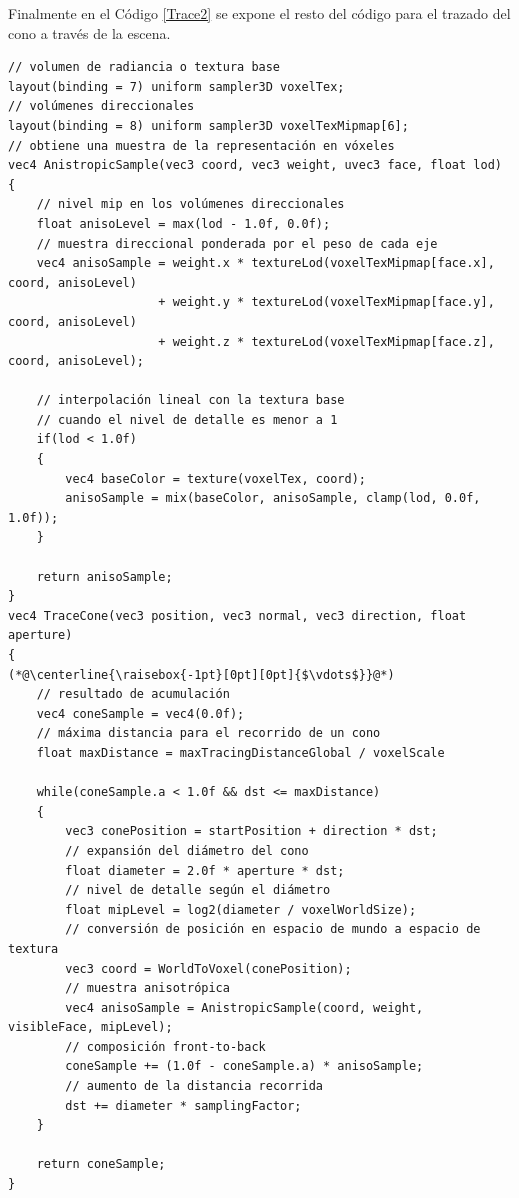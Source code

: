 Finalmente en el Código \ref{Trace2} se expone el resto del código para el trazado del cono a través de la escena.
\\
\begin{lstlisting}[caption={Trazado de cono con vóxeles.}, label=Trace2]
// volumen de radiancia o textura base
layout(binding = 7) uniform sampler3D voxelTex;
// volúmenes direccionales
layout(binding = 8) uniform sampler3D voxelTexMipmap[6];
// obtiene una muestra de la representación en vóxeles
vec4 AnistropicSample(vec3 coord, vec3 weight, uvec3 face, float lod)
{
    // nivel mip en los volúmenes direccionales
    float anisoLevel = max(lod - 1.0f, 0.0f);
    // muestra direccional ponderada por el peso de cada eje
    vec4 anisoSample = weight.x * textureLod(voxelTexMipmap[face.x], coord, anisoLevel)
                     + weight.y * textureLod(voxelTexMipmap[face.y], coord, anisoLevel)
                     + weight.z * textureLod(voxelTexMipmap[face.z], coord, anisoLevel);

    // interpolación lineal con la textura base 
    // cuando el nivel de detalle es menor a 1
    if(lod < 1.0f)
    {
        vec4 baseColor = texture(voxelTex, coord);
        anisoSample = mix(baseColor, anisoSample, clamp(lod, 0.0f, 1.0f));
    }

    return anisoSample;                    
}
vec4 TraceCone(vec3 position, vec3 normal, vec3 direction, float aperture)
{
(*@\centerline{\raisebox{-1pt}[0pt][0pt]{$\vdots$}}@*)
    // resultado de acumulación
    vec4 coneSample = vec4(0.0f);
    // máxima distancia para el recorrido de un cono
    float maxDistance = maxTracingDistanceGlobal / voxelScale

    while(coneSample.a < 1.0f && dst <= maxDistance)
    {
        vec3 conePosition = startPosition + direction * dst;
        // expansión del diámetro del cono
        float diameter = 2.0f * aperture * dst;
        // nivel de detalle según el diámetro
        float mipLevel = log2(diameter / voxelWorldSize);
        // conversión de posición en espacio de mundo a espacio de textura
        vec3 coord = WorldToVoxel(conePosition);
        // muestra anisotrópica
        vec4 anisoSample = AnistropicSample(coord, weight, visibleFace, mipLevel);
        // composición front-to-back
        coneSample += (1.0f - coneSample.a) * anisoSample;
        // aumento de la distancia recorrida
        dst += diameter * samplingFactor;
    }

    return coneSample;
}
\end{lstlisting}

